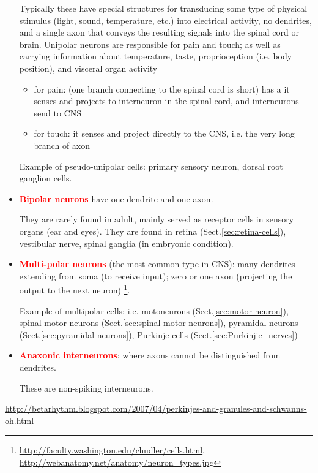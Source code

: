 \begin{itemize}
\begin{itemize}
\end{itemize}

Typically these have special structures for transducing some type of physical
stimulus (light, sound, temperature, etc.) into electrical activity, no
dendrites, and a single axon that conveys the resulting signals into the spinal
cord or brain. Unipolar neurons are responsible for pain and touch; as well as
carrying information about temperature, taste, proprioception (i.e. body position), and
visceral organ activity
\begin{itemize}
  \item for pain: (one branch connecting to the spinal cord is short) has a it
  senses and projects to interneuron in the spinal cord, and interneurons send to CNS
  \item for touch: it senses and project directly to the CNS, i.e. the very long
  branch of axon
\end{itemize}


Example of pseudo-unipolar cells:  primary sensory neuron, dorsal root ganglion
cells.
  

\item \textcolor{red}{\bf Bipolar neurons} have one dendrite and one axon. 

They are rarely found in adult, mainly served as receptor cells in sensory
organs (ear and eyes). They are found in retina (Sect.\ref{sec:retina-cells}),
vestibular nerve, spinal ganglia (in embryonic condition).


\item \textcolor{red}{\bf Multi-polar neurons} (the most common type in CNS):
many dendrites extending from soma (to receive input); zero or one axon
(projecting the output to the next neuron)
\footnote{\url{http://faculty.washington.edu/chudler/cells.html}, \url{http://webanatomy.net/anatomy/neuron_types.jpg}}.


Example of multipolar cells: i.e. motoneurons (Sect.\ref{sec:motor-neuron}),
spinal motor neurons (Sect.\ref{sec:spinal-motor-neurons}), pyramidal neurons
(Sect.\ref{sec:pyramidal-neurons}), Purkinje cells (Sect.\ref{sec:Purkinjie_nerves})
    
  
  \item \textcolor{red}{\bf Anaxonic interneurons}: where axons cannot be
  distinguished from dendrites.
  
  These are non-spiking interneurons.
\end{itemize}
\url{http://betarhythm.blogspot.com/2007/04/perkinjes-and-granules-and-schwanns-oh.html}

